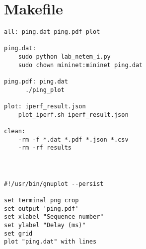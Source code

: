 \section*{Makefile}

\begin{verbatim}
all: ping.dat ping.pdf plot

ping.dat:
	sudo python lab_netem_i.py
	sudo chown mininet:mininet ping.dat

ping.pdf: ping.dat
	  ./ping_plot

plot: iperf_result.json
	plot_iperf.sh iperf_result.json

clean:
	-rm -f *.dat *.pdf *.json *.csv
	-rm -rf results
\end{verbatim}

\section*{}

\begin{verbatim}

#!/usr/bin/gnuplot --persist

set terminal png crop
set output 'ping.pdf'
set xlabel "Sequence number"
set ylabel "Delay (ms)"
set grid
plot "ping.dat" with lines

\end{verbatim}







